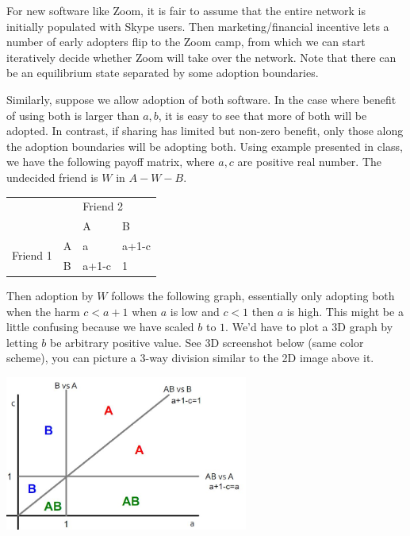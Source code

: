 For new software like Zoom, it is fair to assume that the entire network is initially populated with Skype users. Then marketing/financial incentive lets a number of early adopters flip to the Zoom camp, from which we can start iteratively decide whether Zoom will take over the network. Note that there can be an equilibrium state separated by some adoption boundaries. 

Similarly, suppose we allow adoption of both software. In the case where benefit of using both is larger than $a, b$, it is easy to see that more of both will be adopted. In contrast, if sharing has limited but non-zero benefit, only those along the adoption boundaries will be adopting both. Using example presented in class, we have the following payoff matrix, where $a, c$ are positive real number. The undecided friend is $W$ in $A - W - B$. 

\begin{table}[h]
\centering
\begin{tabular}{ll|ll}
                                              &   & \multicolumn{2}{l}{Friend 2} \\
                                              &   & A             & B            \\\hline
\multicolumn{1}{c}{\multirow{2}{*}{Friend 1}} & A & a             & a+1-c            \\
\multicolumn{1}{c}{}                          & B & a+1-c         & 1           
\end{tabular}
\end{table}

Then adoption by $W$ follows the following graph, essentially only adopting both when the harm $c < a + 1$ when $a$ is low and $c < 1$ then $a$ is high. This might be a little confusing because we have scaled $b$ to $1$. We'd have to plot a 3D graph by letting $b$ be arbitrary positive value. See 3D screenshot below (same color scheme), you can picture a 3-way division similar to the 2D image above it.

{
\centering
\includegraphics[width=0.6\textwidth]{notes/img/l12_p44_both.JPG} \par
}

